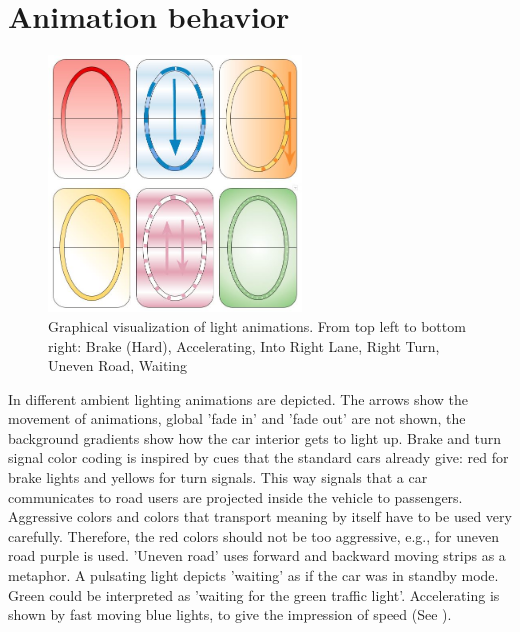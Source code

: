 \section{Animation behavior}
\begin{figure}
    \includegraphics[width=0.6\textwidth]{fig/lightsignals.JPG}
    \caption[Light animations]{Graphical visualization of light animations. From top left to bottom right:
Brake (Hard), Accelerating, Into Right Lane, Right Turn, Uneven Road, Waiting}
    \label{fig:lightanimations}
\end{figure}
In \emph{} different ambient lighting animations are depicted. The arrows show the movement of animations, global 'fade in' and 'fade out' are not shown, the background gradients show how the car interior gets to light up. Brake and turn signal color coding is inspired by cues that the standard cars already give: red for brake lights and yellows for turn signals. This way signals that a car communicates to road users are projected inside the vehicle to passengers. Aggressive colors and colors that transport meaning by itself have to be used very carefully. Therefore, the red colors should not be too aggressive, e.g., for uneven road purple is used. 'Uneven road' uses forward and backward moving strips as a metaphor. A pulsating light depicts 'waiting' as if the car was in standby mode. Green could be interpreted as 'waiting for the green traffic light'. Accelerating is shown by fast moving blue lights, to give the impression of speed (See \emph{}).